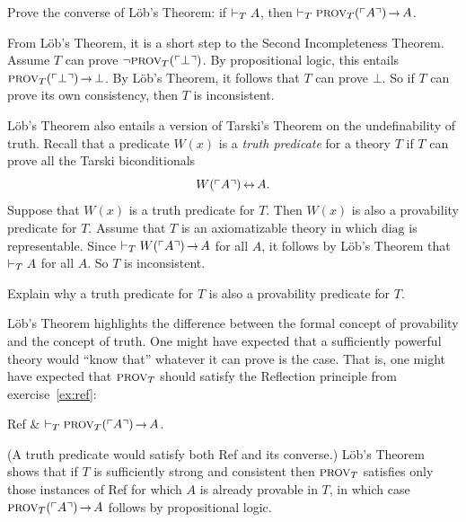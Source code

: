 \begin{exercise}
  Prove the converse of Löb's Theorem:
  if $\vdash_T A$, then $\proves_T \smallcaps{Prov}_T(\gn{A}) \to A$.
\end{exercise}

From Löb's Theorem,
it is a short step to the Second Incompleteness Theorem.
Assume $T$ can prove $\neg \smallcaps{Prov}_T(\gn{\bot})$.
By propositional logic,
this entails $\smallcaps{Prov}_T(\gn{\bot}) \to \bot$.
By Löb's Theorem,
it follows that $T$ can prove $\bot$.
So if $T$ can prove its own consistency,
then $T$ is inconsistent.


Löb's Theorem also entails a version of Tarski's Theorem on the undefinability of truth.
Recall that a predicate $W(x)$ is a \emph{truth predicate} for a theory $T$
if $T$ can prove all the Tarski biconditionals
\[
  W(\gn{A}) \leftrightarrow A.
\]
Suppose that $W(x)$ is a truth predicate for $T$.
Then $W(x)$ is also a provability predicate for $T$.
Assume that $T$ is an axiomatizable theory in which $\mathrm{diag}$ is representable.
Since $\proves_T W(\gn{A}) \to A$ for all $A$,
it follows by Löb's Theorem that $\vdash_T A$ for all $A$.
So $T$ is inconsistent.

\begin{exercise}
  Explain why a truth predicate for $T$ is also a provability predicate for $T$.
\end{exercise}

Löb's Theorem highlights the difference between
the formal concept of provability and the concept of truth.
One might have expected that
a sufficiently powerful theory
would ``know that'' whatever it can prove is the case.
That is,
one might have expected that $\smallcaps{Prov}_T$ should satisfy the Reflection principle
from exercise~\ref{ex:ref}:

\begin{axioms}
  Ref & $\proves_{T} \smallcaps{Prov}_T(\gn{A}) \to A$.
\end{axioms}

(A truth predicate would satisfy both Ref and its converse.)
Löb's Theorem shows that
if $T$ is sufficiently strong and consistent then
$\smallcaps{Prov}_T$ satisfies only those instances of Ref
for which $A$ is already provable in $T$,
in which case $\smallcaps{Prov}_T(\gn{A}) \to A$ follows by propositional logic.

